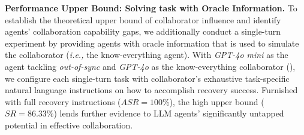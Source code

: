 \textbf{Performance Upper Bound: Solving task with Oracle Information.}
To establish the theoretical upper bound of collaborator influence and identify agents' collaboration capability gaps, we additionally conduct a single-turn experiment by providing agents with oracle information that is used to simulate the collaborator (\textit{i.e.,} the know-everything agent). With \textit{GPT-4o mini} as the agent tackling \textit{out-of-sync} and \textit{GPT-4o} as the know-everything collaborator (), we configure each single-turn task with collaborator’s exhaustive task-specific natural language instructions on how to accomplish recovery success.
Furnished with full recovery instructions ($ASR=100\%$), the high upper bound ($SR=86.33\%$) lends further evidence to LLM agents' significantly untapped potential in effective collaboration.




